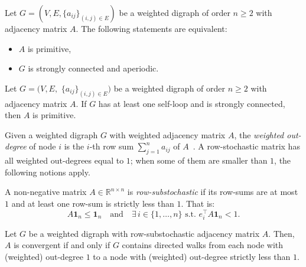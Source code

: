 \begin{theorem}
\label{thm:primitive}
Let $G = (V, E, \{a_{ij}\}_{(i,j) \in E})$ be a weighted digraph of order $n \geq 2$
with adjacency matrix $A$. The following statements are equivalent:
\begin{itemize}
  \item[(i)] $A$ is primitive,
  \item[(ii)] $G$ is strongly connected and aperiodic.
\end{itemize}
\end{theorem}

\begin{corollary}
\label{cor:primitive-selfloop}
Let $G = (V, E,$ $\{a_{ij}\}_{(i,j) \in E})$ be a weighted digraph of order $n \geq 2$
with adjacency matrix $A$. If $G$ has at least one self-loop and is strongly
connected, then $A$ is primitive.
\end{corollary}


Given a weighted digraph $G$ with weighted adjacency matrix $A$, the \emph{weighted
out-degree} of node $i$ is the $i$-th row sum $\sum_{j=1}^{n} a_{ij}$ of
$A$~\cite{baggio_graph}. A row-stochastic matrix has all weighted out-degrees equal to
$1$; when some of them are smaller than $1$, the following notions apply.

\begin{definition}
\label{def:row-substochastic}
A non-negative matrix $A \in \mathbb{R}^{n \times n}$ is \emph{row-substochastic} if
its row-sums are at most $1$ and at least one row-sum is strictly less than $1$. That
is:
\[
  A \mathbf{1}_n \leq \mathbf{1}_n \quad \text{and} \quad
  \exists\, i \in \{1, \dots, n\} \text{ s.t. } e_i^\top A \mathbf{1}_n < 1.
\]
\end{definition}

\begin{lemma}
\label{lem:substochastic}
Let $G$ be a weighted digraph with row-substochastic adjacency matrix $A$. Then, $A$ is
convergent if and only if $G$ contains directed walks from each node with (weighted)
out-degree $1$ to a node with (weighted) out-degree strictly less than $1$.
\end{lemma}
